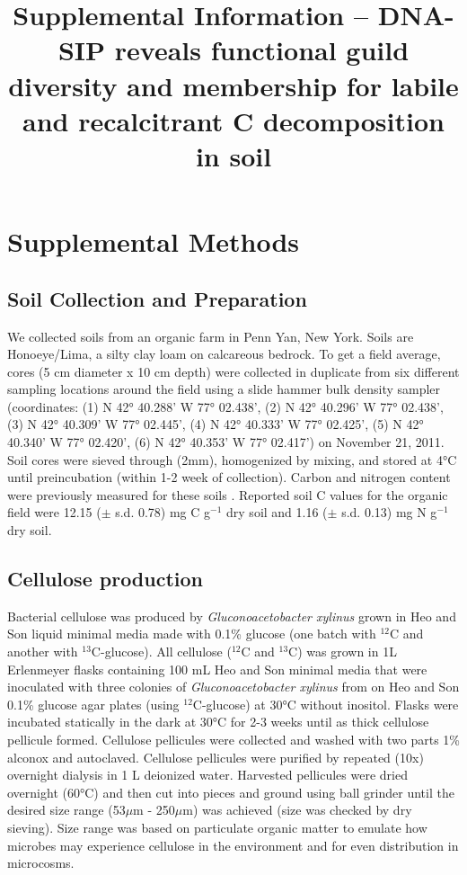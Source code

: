 \documentclass{article}
\title{Supplemental Information -- DNA-SIP reveals functional guild
diversity and membership for labile and recalcitrant C decomposition in
soil}
\begin{document}
\maketitle

\tableofcontents

\listoffigures 

\listoftables

\section{Supplemental Methods}\label{SI} 

\subsection{Soil Collection and Preparation} We collected soils from an organic
farm in Penn Yan, New York. Soils are Honoeye/Lima, a silty clay loam on
calcareous bedrock. To get a field average, cores (5 cm diameter x 10 cm depth)
were collected in duplicate from six different sampling locations around the
field using a slide hammer bulk density sampler (coordinates: (1) N 42°
40.288’ W 77° 02.438’, (2) N 42° 40.296’ W 77° 02.438’, (3) N 42° 40.309’ W 77°
02.445’, (4) N 42° 40.333’ W 77° 02.425’, (5) N 42° 40.340’ W 77° 02.420’, (6)
N 42° 40.353’ W 77° 02.417’) on November 21, 2011. Soil cores were sieved
through (2mm), homogenized by mixing, and stored at 4°C until preincubation
(within 1-2 week of collection).  Carbon and nitrogen content were
previously measured for these soils \citep{Berthrong_2013}. Reported soil
C values for the organic field were 12.15 ($\pm$ s.d. 0.78) mg C g$^{-1}$
dry soil and 1.16 ($\pm$ s.d. 0.13) mg N g$^{-1}$ dry soil. 

\subsection{Cellulose production}
Bacterial cellulose was produced by \textit{Gluconoacetobacter xylinus} grown
in Heo and Son \citep{Heo_2002} liquid minimal media made with 0.1\% glucose
(one batch with $^{12}$C and another with $^{13}$C-glucose). All cellulose
($^{12}$C and $^{13}$C) was grown in 1L Erlenmeyer flasks containing 100 mL Heo
and Son minimal media that were inoculated with three colonies of
\textit{Gluconoacetobacter xylinus} from on Heo and Son 0.1\% glucose agar
plates (using $^{12}$C-glucose) at 30°C without inositol. Flasks were incubated
statically in the dark at 30°C for 2-3 weeks until as thick cellulose pellicule
formed.  Cellulose pellicules were collected and washed with two parts 1\%
alconox and autoclaved. Cellulose pellicules were purified by repeated (10x)
overnight dialysis in 1 L deionized water. Harvested pellicules were dried
overnight (60°C) and then cut into pieces and ground using ball grinder until
the desired size range (53$\mu$m - 250$\mu$m) was achieved (size was checked by
dry sieving). Size range was based on particulate organic matter to emulate how
microbes may experience cellulose in the environment \citep{Cambardella_1992}
and for even distribution in microcosms. 
\end{document}
